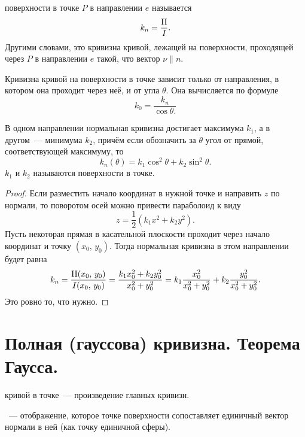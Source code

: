 \documentclass{notes}
\newcommand{\II}{\mr{II}}
\begin{document}
	\begin{de}
		 поверхности в точке $P$ в направлении $e$ называется 
		\[
			k_n = \dfrac{\II}{I}.
		\]
		Другими словами, это кривизна кривой, лежащей на поверхности, проходящей через $P$ в направлении $e$ такой, что вектор $\nu \parallel n$.
	\end{de}

	\begin{thm}[Мёнье]
		Кривизна кривой на поверхности в точке зависит только от направления, в котором она проходит через неё, и от угла $\theta$. Она вычисляется по формуле
		\[
			k_0 = \dfrac{k_n}{\cos \theta.}
		\]
	\end{thm}

	\begin{thm}
		В одном направлении нормальная кривизна достигает максимума $k_1$, а в другом~--- минимума $k_2$, причём если обозначить за $\theta$ угол от прямой, соответствующей максимуму, то
		\[
			k_n(\theta) = k_1 \cos^2 \theta + k_2 \sin^2 \theta.
		\]
		$k_1$ и $k_2$ называются  поверхности в точке.
		\begin{proof}
			Если разместить начало координат в нужной точке и направить $z$ по нормали, то поворотом осей можно привести параболоид к виду
			\[
				z = \dfrac{1}{2}(k_1 x^2 + k_2 y^2).
			\]
			Пусть некоторая прямая в касательной плоскости проходит через начало координат и точку $(x_0, \, y_0)$. Тогда нормальная кривизна в этом направлении будет равна
			\[
				k_n = \dfrac{\II(x_0, \, y_0)}{I(x_0, \, y_0)} = \dfrac{k_1 x_0^2 + k_2 y_0^2}{x_0^2 + y_0^2} = k_1 \dfrac{x_0^2}{x_0^2 + y_0^2} + k_2 \dfrac{y_0^2}{x_0^2 + y_0^2}.
			\]
			Это ровно то, что нужно.
		\end{proof}
	\end{thm}

\section{Полная (гауссова) кривизна. Теорема Гаусса.}

	\begin{de}
		 кривой в точке~--- произведение главных кривизн.
	\end{de}

	\begin{de}
		~--- отображение, которое точке поверхности сопоставляет единичный вектор нормали в ней (как точку единичной сферы).
	\end{de}
\end{document}
